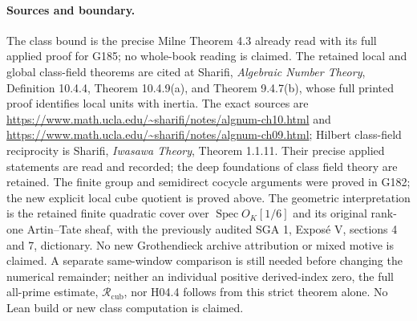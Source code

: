 \paragraph{Sources and boundary.}
The class bound is the precise Milne Theorem 4.3 already read with
its full applied proof for G185; no whole-book reading is claimed.
The retained local and global class-field theorems are cited at
Sharifi, \emph{Algebraic Number Theory}, Definition 10.4.4,
Theorem 10.4.9(a), and Theorem 9.4.7(b), whose full printed proof
identifies local units with inertia.  The exact sources are
\url{https://www.math.ucla.edu/~sharifi/notes/algnum-ch10.html}
and \url{https://www.math.ucla.edu/~sharifi/notes/algnum-ch09.html};
Hilbert class-field reciprocity is Sharifi, \emph{Iwasawa Theory},
Theorem 1.1.11.  Their precise applied statements are read and
recorded; the deep foundations of class field theory are retained.
The finite group and semidirect cocycle arguments were proved in
G182; the new explicit local cube quotient is proved above.
The geometric interpretation is the retained finite quadratic cover
over $\operatorname{Spec}O_K[1/6]$ and its original rank-one
Artin--Tate sheaf, with the previously audited SGA 1, Expos\'e V,
sections 4 and 7, dictionary.  No new Grothendieck archive attribution
or mixed motive is claimed.  A separate same-window comparison is
still needed before changing the numerical remainder; neither an
individual positive derived-index zero, the full all-prime estimate,
$\mathcal R_{\mathrm{cub}}$, nor H04.4 follows from this strict theorem
alone.  No Lean build or new class computation is claimed.
